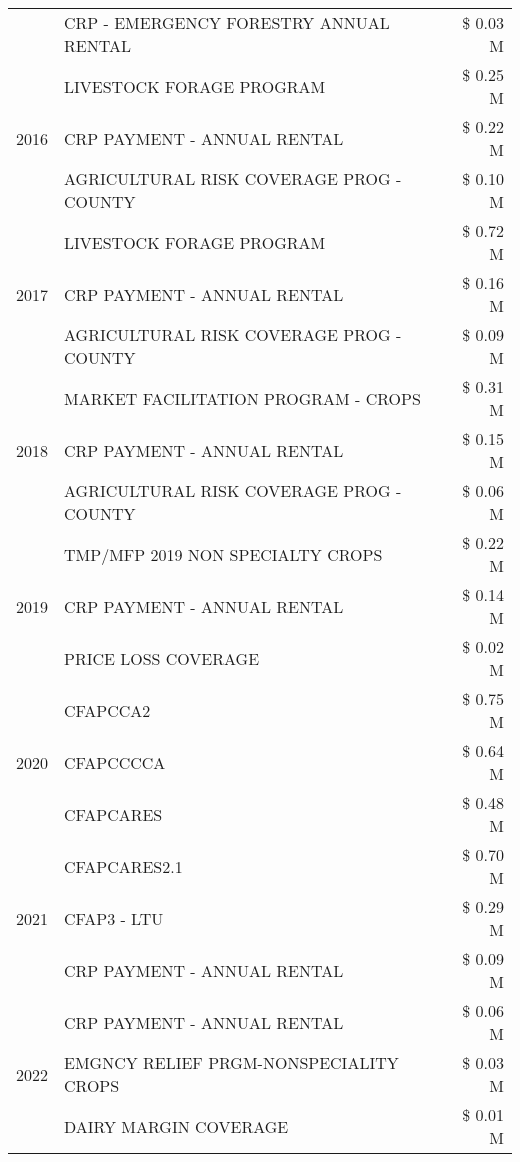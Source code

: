 \begin{tabular}{llr}
 & CRP - EMERGENCY FORESTRY ANNUAL RENTAL & \$ 0.03 M \\
\cline{1-3}
\multirow[t]{3}{*}{2016} & LIVESTOCK FORAGE PROGRAM & \$ 0.25 M \\
 & CRP PAYMENT - ANNUAL RENTAL & \$ 0.22 M \\
 & AGRICULTURAL RISK COVERAGE PROG - COUNTY & \$ 0.10 M \\
\cline{1-3}
\multirow[t]{3}{*}{2017} & LIVESTOCK FORAGE PROGRAM & \$ 0.72 M \\
 & CRP PAYMENT - ANNUAL RENTAL & \$ 0.16 M \\
 & AGRICULTURAL RISK COVERAGE PROG - COUNTY & \$ 0.09 M \\
\cline{1-3}
\multirow[t]{3}{*}{2018} & MARKET FACILITATION PROGRAM - CROPS & \$ 0.31 M \\
 & CRP PAYMENT - ANNUAL RENTAL & \$ 0.15 M \\
 & AGRICULTURAL RISK COVERAGE PROG - COUNTY & \$ 0.06 M \\
\cline{1-3}
\multirow[t]{3}{*}{2019} & TMP/MFP 2019 NON SPECIALTY CROPS & \$ 0.22 M \\
 & CRP PAYMENT - ANNUAL RENTAL & \$ 0.14 M \\
 & PRICE LOSS COVERAGE & \$ 0.02 M \\
\cline{1-3}
\multirow[t]{3}{*}{2020} & CFAPCCA2 & \$ 0.75 M \\
 & CFAPCCCCA & \$ 0.64 M \\
 & CFAPCARES & \$ 0.48 M \\
\cline{1-3}
\multirow[t]{3}{*}{2021} & CFAPCARES2.1 & \$ 0.70 M \\
 & CFAP3 - LTU & \$ 0.29 M \\
 & CRP PAYMENT - ANNUAL RENTAL & \$ 0.09 M \\
\cline{1-3}
\multirow[t]{3}{*}{2022} & CRP PAYMENT - ANNUAL RENTAL & \$ 0.06 M \\
 & EMGNCY RELIEF PRGM-NONSPECIALITY CROPS & \$ 0.03 M \\
 & DAIRY MARGIN COVERAGE & \$ 0.01 M \\
\cline{1-3}
\bottomrule
\end{tabular}
